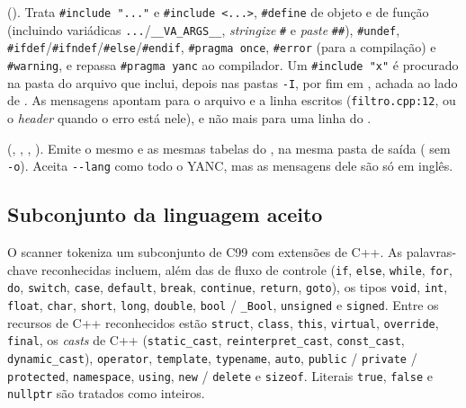 \begin{description}[leftmargin=2em]
  \item[Pré-processador] (). Trata
  \lstinline|#include "..."| e \lstinline|#include <...>|, \lstinline|#define| de
  objeto e de função (incluindo variádicas
  \lstinline|...|/\lstinline|__VA_ARGS__|, \emph{stringize} \lstinline|#| e
  \emph{paste} \lstinline|##|), \lstinline|#undef|,
  \lstinline|#ifdef|/\lstinline|#ifndef|/\lstinline|#else|/\lstinline|#endif|,
  \lstinline|#pragma once|, \lstinline|#error| (para a compilação) e
  \lstinline|#warning|, e repassa \lstinline|#pragma yanc| ao compilador. Um
  \lstinline|#include "x"| é procurado na pasta do arquivo que inclui, depois nas
  pastas \lstinline|-I|, por fim em , achada ao lado de
  . As mensagens apontam para o arquivo e a linha escritos
  (\lstinline|filtro.cpp:12|, ou o \emph{header} quando o erro está nele), e não
  mais para uma linha do .
  \item[Compilador] (, , ,
  ). Emite o mesmo  e as mesmas tabelas do
  , na mesma pasta de saída ( sem \lstinline|-o|).
  Aceita \lstinline|--lang| como todo o YANC, mas as mensagens dele são só em
  inglês.
\end{description}

\subsection{Subconjunto da linguagem aceito}

O scanner  tokeniza um subconjunto de C99 com extensões de C++.
As palavras-chave reconhecidas incluem, além das de fluxo de controle
(\lstinline|if|, \lstinline|else|, \lstinline|while|, \lstinline|for|,
\lstinline|do|, \lstinline|switch|, \lstinline|case|, \lstinline|default|,
\lstinline|break|, \lstinline|continue|, \lstinline|return|, \lstinline|goto|),
os tipos \lstinline|void|, \lstinline|int|, \lstinline|float|, \lstinline|char|,
\lstinline|short|, \lstinline|long|, \lstinline|double|, \lstinline|bool| /
\lstinline|_Bool|, \lstinline|unsigned| e \lstinline|signed|. Entre os recursos
de C++ reconhecidos estão \lstinline|struct|, \lstinline|class|, \lstinline|this|,
\lstinline|virtual|, \lstinline|override|, \lstinline|final|, os \emph{casts} de
C++ (\lstinline|static_cast|, \lstinline|reinterpret_cast|, \lstinline|const_cast|,
\lstinline|dynamic_cast|), \lstinline|operator|, \lstinline|template|,
\lstinline|typename|, \lstinline|auto|, \lstinline|public| /
\lstinline|private| / \lstinline|protected|, \lstinline|namespace|,
\lstinline|using|, \lstinline|new| / \lstinline|delete| e
\lstinline|sizeof|. Literais \lstinline|true|, \lstinline|false| e
\lstinline|nullptr| são tratados como inteiros.

